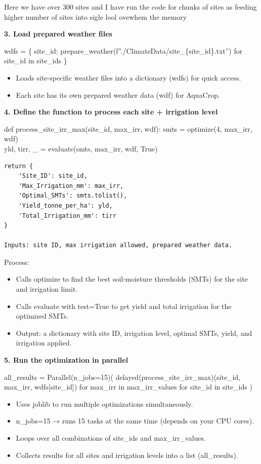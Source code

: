 \documentclass[
  letterpaper,
  DIV=11,
  numbers=noendperiod]{scrartcl}
\providecommand{\tightlist}{%
  \setlength{\itemsep}{0pt}\setlength{\parskip}{0pt}}\usepackage{longtable,booktabs,array}
\begin{document}
Here we have over 300 sites and I have run the code for chunks of sites
as feeding higher number of sites into sigle lool ovewhem the memory

\textbf{3. Load prepared weather files}

wdfs = \{ site\_id:
prepare\_weather(f''./ClimateData/site\_\{site\_id\}.txt'') for site\_id
in site\_ids \}

\begin{itemize}
\tightlist
\item
  Loads site-specific weather files into a dictionary (wdfs) for quick
  access.
\item
  Each site has its own prepared weather data (wdf) for AquaCrop.
\end{itemize}

\textbf{4. Define the function to process each site + irrigation level}

def process\_site\_irr\_max(site\_id, max\_irr, wdf): smts = optimize(4,
max\_irr, wdf)\\
yld, tirr, \_ = evaluate(smts, max\_irr, wdf, True)

\begin{verbatim}
return {
    'Site_ID': site_id,
    'Max_Irrigation_mm': max_irr,
    'Optimal_SMTs': smts.tolist(),
    'Yield_tonne_per_ha': yld,
    'Total_Irrigation_mm': tirr
}

Inputs: site ID, max irrigation allowed, prepared weather data.
\end{verbatim}

Process:

\begin{itemize}
\item
  Calls optimize to find the best soil-moisture thresholds (SMTs) for
  the site and irrigation limit.
\item
  Calls evaluate with test=True to get yield and total irrigation for
  the optimized SMTs.
\item
  Output: a dictionary with site ID, irrigation level, optimal SMTs,
  yield, and irrigation applied.
\end{itemize}

\textbf{5. Run the optimization in parallel}

all\_results = Parallel(n\_jobs=15)(
delayed(process\_site\_irr\_max)(site\_id, max\_irr, wdfs{[}site\_id{]})
for max\_irr in max\_irr\_values for site\_id in site\_ids )

\begin{itemize}
\tightlist
\item
  Uses joblib to run multiple optimizations simultaneously.
\item
  n\_jobs=15 → runs 15 tasks at the same time (depends on your CPU
  cores).
\item
  Loops over all combinations of site\_ids and max\_irr\_values.
\item
  Collects results for all sites and irrigation levels into a list
  (all\_results).
\end{itemize}
\end{document}
